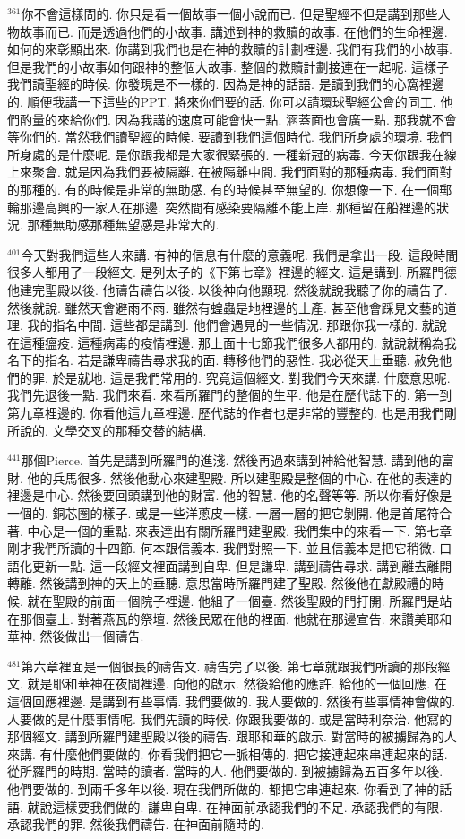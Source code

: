 \documentclass{book}
\begin{document}
$^{361}$你不會這樣問的.
你只是看一個故事一個小說而已.
但是聖經不但是講到那些人物故事而已.
而是透過他們的小故事.
講述到神的救贖的故事.
在他們的生命裡邊.
如何的來彰顯出來.
你講到我們也是在神的救贖的計劃裡邊.
我們有我們的小故事.
但是我們的小故事如何跟神的整個大故事.
整個的救贖計劃接連在一起呢.
這樣子我們讀聖經的時候.
你發現是不一樣的.
因為是神的話語.
是讀到我們的心窩裡邊的.
順便我講一下這些的PPT.
將來你們要的話.
你可以請環球聖經公會的同工.
他們酌量的來給你們.
因為我講的速度可能會快一點.
涵蓋面也會廣一點.
那我就不會等你們的.
當然我們讀聖經的時候.
要讀到我們這個時代.
我們所身處的環境.
我們所身處的是什麼呢.
是你跟我都是大家很緊張的.
一種新冠的病毒.
今天你跟我在線上來聚會.
就是因為我們要被隔離.
在被隔離中間.
我們面對的那種病毒.
我們面對的那種的.
有的時候是非常的無助感.
有的時候甚至無望的.
你想像一下.
在一個郵輪那邊高興的一家人在那邊.
突然間有感染要隔離不能上岸.
那種留在船裡邊的狀況.
那種無助感那種無望感是非常大的.

$^{401}$今天對我們這些人來講.
有神的信息有什麼的意義呢.
我們是拿出一段.
這段時間很多人都用了一段經文.
是列太子的《下第七章》裡邊的經文.
這是講到.
所羅門德他建完聖殿以後.
他禱告禱告以後.
以後神向他顯現.
然後就說我聽了你的禱告了.
然後就說.
雖然天會避雨不雨.
雖然有蝗蟲是地裡邊的土產.
甚至他會踩見文藝的道理.
我的指名中間.
這些都是講到.
他們會遇見的一些情況.
那跟你我一樣的.
就說在這種瘟疫.
這種病毒的疫情裡邊.
那上面十七節我們很多人都用的.
就說就稱為我名下的指名.
若是謙卑禱告尋求我的面.
轉移他們的惡性.
我必從天上垂聽.
赦免他們的罪.
於是就地.
這是我們常用的.
究竟這個經文.
對我們今天來講.
什麼意思呢.
我們先退後一點.
我們來看.
來看所羅門的整個的生平.
他是在歷代誌下的.
第一到第九章裡邊的.
你看他這九章裡邊.
歷代誌的作者也是非常的豐整的.
也是用我們剛所說的.
文學交叉的那種交替的結構.

$^{441}$那個Pierce.
首先是講到所羅門的進淺.
然後再過來講到神給他智慧.
講到他的富財.
他的兵馬很多.
然後他動心來建聖殿.
所以建聖殿是整個的中心.
在他的表達的裡邊是中心.
然後要回頭講到他的財富.
他的智慧.
他的名聲等等.
所以你看好像是一個的.
銅芯圈的樣子.
或是一些洋蔥皮一樣.
一層一層的把它剝開.
他是首尾符合著.
中心是一個的重點.
來表達出有關所羅門建聖殿.
我們集中的來看一下.
第七章剛才我們所讀的十四節.
何本跟信義本.
我們對照一下.
並且信義本是把它稍微.
口語化更新一點.
這一段經文裡面講到自卑.
但是謙卑.
講到禱告尋求.
講到離去離開轉離.
然後講到神的天上的垂聽.
意思當時所羅門建了聖殿.
然後他在獻殿禮的時候.
就在聖殿的前面一個院子裡邊.
他組了一個臺.
然後聖殿的門打開.
所羅門是站在那個臺上.
對著燕瓦的祭壇.
然後民眾在他的裡面.
他就在那邊宣告.
來讚美耶和華神.
然後做出一個禱告.

$^{481}$第六章裡面是一個很長的禱告文.
禱告完了以後.
第七章就跟我們所讀的那段經文.
就是耶和華神在夜間裡邊.
向他的啟示.
然後給他的應許.
給他的一個回應.
在這個回應裡邊.
是講到有些事情.
我們要做的.
我人要做的.
然後有些事情神會做的.
人要做的是什麼事情呢.
我們先讀的時候.
你跟我要做的.
或是當時利奈治.
他寫的那個經文.
講到所羅門建聖殿以後的禱告.
跟耶和華的啟示.
對當時的被擄歸為的人來講.
有什麼他們要做的.
你看我們把它一脈相傳的.
把它接連起來串連起來的話.
從所羅門的時期.
當時的讀者.
當時的人.
他們要做的.
到被擄歸為五百多年以後.
他們要做的.
到兩千多年以後.
現在我們所做的.
都把它串連起來.
你看到了神的話語.
就說這樣要我們做的.
謙卑自卑.
在神面前承認我們的不足.
承認我們的有限.
承認我們的罪.
然後我們禱告.
在神面前隨時的.
\end{document}
